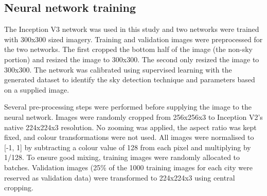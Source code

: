 \documentclass[final,3p,times,authoryear]{elsarticle}
\begin{document}
\subsection{Neural network training}\label{sec:nntraining}    

The Inception V3 network was used in this study and two networks were trained with 300x300 sized imagery. Training and validation images were preprocessed for the two networks. The first cropped the bottom half of the image (the non-sky portion) and resized the image to 300x300. The second only resized the image to 300x300. The network  was calibrated using supervised learning with the generated dataset to identify the sky detection technique and parameters based on a supplied image. 


Several pre-processing steps were performed before supplying the image to the neural network. Images were randomly cropped from 256x256x3 to Inception V2's native 224x224x3 resolution. No zooming was applied, the aspect ratio was kept fixed, and colour transformations were not used. All images were normalised to [-1, 1] by subtracting a colour value of 128 from each pixel and multiplying by 1/128. To ensure good mixing, training images were randomly allocated to batches. Validation images (25\% of the 1000 training images for each city were reserved as validation data) were transformed to 224x224x3 using central cropping.
%
%
%
%
\end{document}
